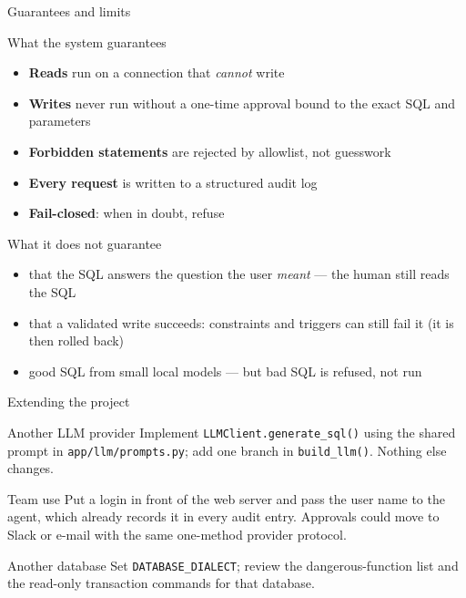 \documentclass[aspectratio=169,10pt]{beamer}
\begin{document}
\begin{frame}{Guarantees and limits}
  \begin{block}{What the system guarantees}
    \footnotesize
    \begin{itemize}
      \item \textbf{Reads} run on a connection that \emph{cannot} write
      \item \textbf{Writes} never run without a one-time approval bound to the exact
            SQL and parameters
      \item \textbf{Forbidden statements} are rejected by allowlist, not guesswork
      \item \textbf{Every request} is written to a structured audit log
      \item \textbf{Fail-closed}: when in doubt, refuse
    \end{itemize}
  \end{block}

  \begin{alertblock}{What it does not guarantee}
    \footnotesize
    \begin{itemize}
      \item that the SQL answers the question the user \emph{meant} --- the human
            still reads the SQL
      \item that a validated write succeeds: constraints and triggers can still fail
            it (it is then rolled back)
      \item good SQL from small local models --- but bad SQL is refused, not run
    \end{itemize}
  \end{alertblock}
\end{frame}

\begin{frame}{Extending the project}
  \begin{block}{Another LLM provider}
    \footnotesize
    Implement \texttt{LLMClient.generate\_sql()} using the shared prompt in
    \texttt{app/llm/prompts.py}; add one branch in \texttt{build\_llm()}.
    Nothing else changes.
  \end{block}

  \begin{block}{Team use}
    \footnotesize
    Put a login in front of the web server and pass the user name to the agent,
    which already records it in every audit entry. Approvals could move to Slack or
    e-mail with the same one-method provider protocol.
  \end{block}

  \begin{block}{Another database}
    \footnotesize
    Set \texttt{DATABASE\_DIALECT}; review the dangerous-function list and the
    read-only transaction commands for that database.
  \end{block}
\end{frame}
\end{document}
